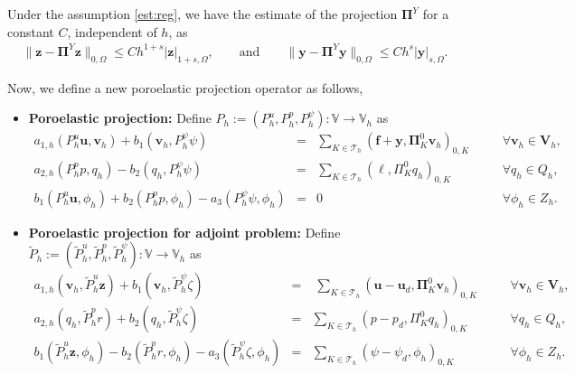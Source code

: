 \documentclass[smallextended]{svjour3}
\numberwithin{equation}{section}
\numberwithin{figure}{section}
\numberwithin{table}{section}
\newcommand\bV{\mathbf{V}}
\newcommand\bPi{\boldsymbol{\Pi}}
\newcommand\ff{\boldsymbol{f}}
\newcommand{\tP}{\tilde{P}}
\newcommand\by{\boldsymbol{y}}
\newcommand\bu{\boldsymbol{u}}
\newcommand\bv{\boldsymbol{v}}
\newcommand\bz{\boldsymbol{z}}
\newcommand\cT{\mathcal{T}}
\newcommand{\bbV}{\mathbb{V}}
\begin{document}
    \begin{lemma}
        Under the assumption \eqref{est:reg}, we have the estimate of the projection $\bPi^Y$ for a constant $C$, independent of $h$, as
        \begin{align*}
            \| \bz - \bPi^Y \bz \|_{0, \Omega} \le C h^{1 + s} | \bz |_{1+s, \Omega}, \qquad \text{and} \qquad 
            \| \by - \bPi^Y \by \|_{0, \Omega} \le C h^{ s} | \by |_{s, \Omega}.
        \end{align*}
    \end{lemma}
	Now, we define a new poroelastic projection operator as follows,
	\begin{itemize}
	\item {\bf Poroelastic projection:} Define $P_h:=(P_h^u, P_h^p, P_h^{\psi}): \bbV \to \bbV_h$ as
	\begin{subequations}\label{eq:Poro-proj-D}
		\begin{alignat}{6}
			a_{1,h}(P_h^u \bu, \bv_h)+  b_1(\bv_h, P_h^{\psi} \psi)     &=& \sum_{K \in \cT_h} (\ff+ \by, \bPi^{0}_K \bv_h )_{0,K}   &\quad&\forall \bv_h \in \bV_h,\\
			a_{2,h}(P_h^p p, q_h)   -    b_2(q_h, P_h^{\psi} \psi)  &=& \sum_{K \in \cT_h} (\ell, \Pi^{0}_K q_h )_{0,K}  \quad &\quad&\forall q_h \in Q_h,  \\
			b_1(P_h^u \bu, \phi_h)  +  b_2(P_h^p p, \phi_h) - a_3(P_h^\psi \psi, \phi_h)  &=&0 \qquad  \qquad   \quad &\quad&\forall \phi_h \in Z_h.
	\end{alignat}\end{subequations}
	
	\item {\bf Poroelastic projection for adjoint problem:} Define $\tP_h:=(\tP_h^u, \tP_h^p, \tP_h^{\psi}): \bbV \to \bbV_h$ as
	\begin{subequations}\label{eq:Poro-adjoint-D}
		\begin{alignat}{6}
			a_{1,h}(\bv_h, \tP_h^u \bz) +  b_1(\bv_h, \tP_h^{\psi} \zeta)     &=&\; \sum_{K \in \cT_h} ( \bu - \bu_d, \bPi^{0}_K \bv_h )_{0,K}  &\quad&\forall \bv_h \in \bV_h,\\
			a_{2,h}(q_h, \tP_h^p r)   +    b_2(q_h, \tP_h^{\psi} \zeta)  &=& \sum_{K \in \cT_h} ( p- p_d, \Pi^{0}_K q_h )_{0,K}  &\quad&\forall q_h \in Q_h,  \\
			b_1(\tP_h^u \bz, \phi_h)    -  b_2(\tP_h^p r, \phi_h)- a_3(\tP_h^\psi \zeta, \phi_h)  &=& \sum_{K \in \cT_h} ( \psi- \psi_d, \phi_h )_{0,K} \quad    &\quad&\forall \phi_h \in Z_h.
	\end{alignat}\end{subequations}
	\end{itemize}
\end{document}
